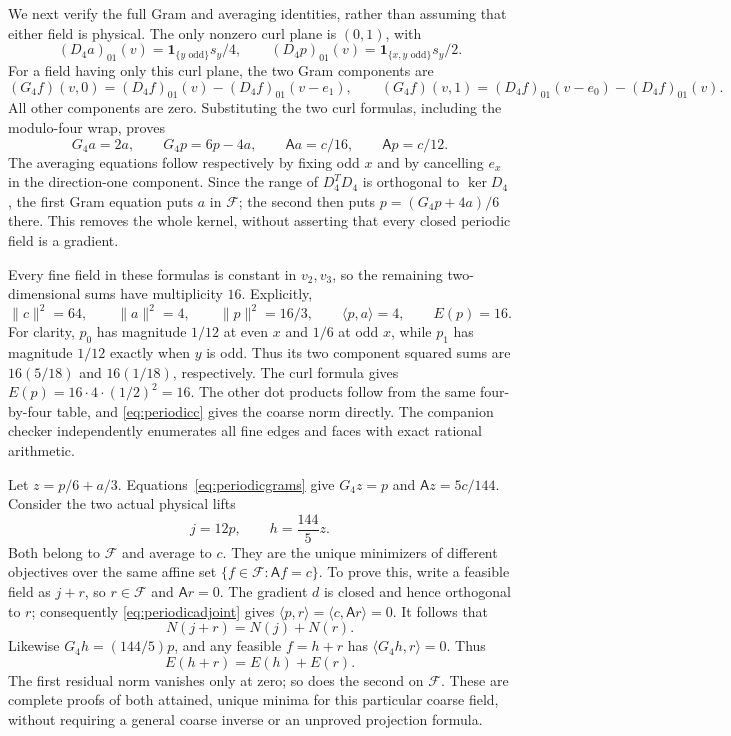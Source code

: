 \documentclass[11pt]{article}
\begin{document}
We next verify the full Gram and averaging identities, rather than
assuming that either field is physical. The only nonzero curl plane is
$(0,1)$, with
\[
 (D_4a)_{01}(v)=\mathbf1_{\{y\text{ odd}\}}s_y/4,\qquad
 (D_4p)_{01}(v)=\mathbf1_{\{x,y\text{ odd}\}}s_y/2.
\]
For a field having only this curl plane, the two Gram components are
\[
 (G_4f)(v,0)=(D_4f)_{01}(v)-(D_4f)_{01}(v-e_1),\qquad
 (G_4f)(v,1)=(D_4f)_{01}(v-e_0)-(D_4f)_{01}(v).
\]
All other components are zero. Substituting the two curl formulas,
including the modulo-four wrap, proves
\begin{equation}\label{eq:periodicgrams}
 G_4a=2a,\qquad G_4p=6p-4a,\qquad
 \mathsf A a=c/16,\qquad\mathsf A p=c/12.
\end{equation}
The averaging equations follow respectively by fixing odd $x$ and by
cancelling $e_x$ in the direction-one component. Since the range of
$D_4^TD_4$ is orthogonal to $\ker D_4$, the first Gram equation puts
$a$ in $\mathcal F$; the second then puts $p=(G_4p+4a)/6$ there.
This removes the whole kernel, without asserting that every closed
periodic field is a gradient.

Every fine field in these formulas is constant in $v_2,v_3$, so the
remaining two-dimensional sums have multiplicity $16$. Explicitly,
\begin{equation}\label{eq:periodicdotdata}
 \|c\|^2=64,\qquad \|a\|^2=4,\qquad
 \|p\|^2=16/3,\qquad\langle p,a\rangle=4,\qquad E(p)=16.
\end{equation}
For clarity, $p_0$ has magnitude $1/12$ at even $x$ and $1/6$ at
odd $x$, while $p_1$ has magnitude $1/12$ exactly when $y$ is odd.
Thus its two component squared sums are $16(5/18)$ and $16(1/18)$,
respectively. The curl formula gives $E(p)=16\cdot4\cdot(1/2)^2=16$.
The other dot products follow from the same four-by-four table, and
\eqref{eq:periodicc} gives the coarse norm directly. The companion
checker independently enumerates all fine edges and faces with exact
rational arithmetic.

Let $z=p/6+a/3$. Equations~\eqref{eq:periodicgrams} give
$G_4z=p$ and $\mathsf A z=5c/144$. Consider the two actual physical lifts
\[
 j=12p,\qquad h=\frac{144}{5}z.
\]
Both belong to $\mathcal F$ and average to $c$. They are the unique
minimizers of different objectives over the same affine set
$\{f\in\mathcal F:\mathsf A f=c\}$. To prove this, write a feasible
field as $j+r$, so $r\in\mathcal F$ and $\mathsf A r=0$.
The gradient $d$ is closed and hence orthogonal to $r$; consequently
\eqref{eq:periodicadjoint} gives
$\langle p,r\rangle=\langle c,\mathsf A r\rangle=0$.
It follows that
\[
 N(j+r)=N(j)+N(r).
\]
Likewise $G_4h=(144/5)p$, and any feasible $f=h+r$ has
$\langle G_4h,r\rangle=0$. Thus
\[
 E(h+r)=E(h)+E(r).
\]
The first residual norm vanishes only at zero; so does the second on
$\mathcal F$. These are complete proofs of both attained, unique
minima for this particular coarse field, without requiring a general
coarse inverse or an unproved projection formula.
\end{document}

